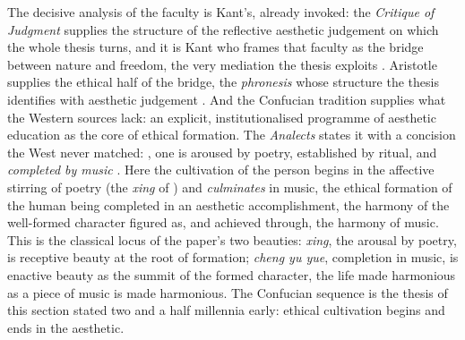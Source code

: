 The decisive analysis of the faculty is Kant's, already invoked: the \emph{Critique of Judgment} supplies the structure of the reflective aesthetic judgement on which the whole thesis turns, and it is Kant who frames that faculty as the bridge between nature and freedom, the very mediation the thesis exploits \parencite{kant1987}. Aristotle supplies the ethical half of the bridge, the \emph{phronesis} whose structure the thesis identifies with aesthetic judgement \parencite{aristotle2000}. And the Confucian tradition supplies what the Western sources lack: an explicit, institutionalised programme of aesthetic education as the core of ethical formation. The \emph{Analects} states it with a concision the West never matched: , one is aroused by poetry, established by ritual, and \emph{completed by music} \parencite{confucius_analects}. Here the cultivation of the person begins in the affective stirring of poetry (the \emph{xing} of ) and \emph{culminates} in music, the ethical formation of the human being completed in an aesthetic accomplishment, the harmony of the well-formed character figured as, and achieved through, the harmony of music. This is the classical locus of the paper's two beauties: \emph{xing}, the arousal by poetry, is receptive beauty at the root of formation; \emph{cheng yu yue}, completion in music, is enactive beauty as the summit of the formed character, the life made harmonious as a piece of music is made harmonious. The Confucian sequence is the thesis of this section stated two and a half millennia early: ethical cultivation begins and ends in the aesthetic.

